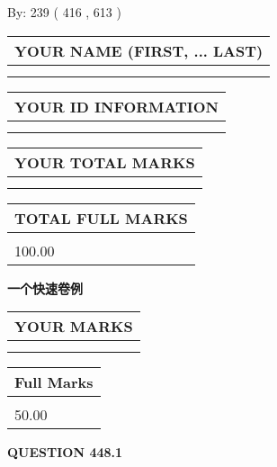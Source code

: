 \documentclass{ctexart}
\begin{document}
   
\hspace{1.0in} By: 
 239 ( 416 ,  613 )
   
   
   
   
\newpage 
\setcounter{page}{ 
   448001 } 
   
   
   
   
\noindent\begin{tabular}{|l|}
\hline
YOUR NAME (FIRST, ... LAST)  \\
\hline
 \\ 
 \\ 
\hline
\end{tabular}
\hspace{0.05in} \begin{tabular}{|l|}
\hline
 YOUR   ID   INFORMATION  \\
\hline
 \\ 
 \\ 
\hline
\end{tabular}
   
   
\vspace{0.2in}\noindent\begin{tabular}{|l|}
\hline
YOUR TOTAL MARKS  \\
\hline
 \\ 
 \\ 
\hline
\end{tabular}
\hspace{0.05in} \begin{tabular}{|l|}
\hline
TOTAL FULL MARKS  \\
\hline
 \\ 
100.00 \\
\hline
\end{tabular}
   
   
 \vspace{0.2in}
{\LARGE {\textbf{ 一个快速卷例}}}
   
   
  
\vspace{0.2in}
  
\noindent\begin{tabular}{|l|}
\hline
 YOUR MARKS  \\
\hline
 \\ 
 \\ 
\hline
\end{tabular}
\hspace{0.05in} \begin{tabular}{|l|}
\hline
 Full Marks  \\
\hline
 \\ 
50.00 \\
\hline
\end{tabular}
{\textbf{\Large{QUESTION
448.1 
}}}
  
\end{document}
